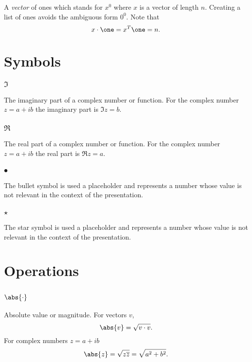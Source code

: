 \subsubsection*{\one}
A \textit{vector} of ones which stands for $x^0$ where $x$ is a vector of length $n$. Creating a list of ones avoids the ambiguous form $0^0$. Note that 
\begin{equation}
  x \cdot \one = x^T \one = n.
\end{equation}

\section*{Symbols} 

\subsubsection*{$\Im$}
The imaginary part of a complex number or function. For the complex number $z=a+ib$ the imaginary part is $\Im z=b$.

\subsubsection*{$\Re$}
The real part of a complex number or function. For the complex number $z=a+ib$ the real part is $\Re z=a$.

\subsubsection*{$\bullet$}
The bullet symbol is used a placeholder and represents a number whose value is not relevant in the context of the presentation.

\subsubsection*{$\star$}
The star symbol is used a placeholder and represents a number whose value is not relevant in the context of the presentation.

\section*{Operations} 

\subsection*{$\abs{\cdot}$}
Absolute value or magnitude. For vectors $v$,
\begin{equation}
  \abs{v}=\sqrt{v\cdot v}.
\end{equation}
For complex numbers $z=a+ib$
\begin{equation}
  \abs{z}= \sqrt{z\overline{z}} = \sqrt{a^{2}+b^{2}}.
\end{equation}

